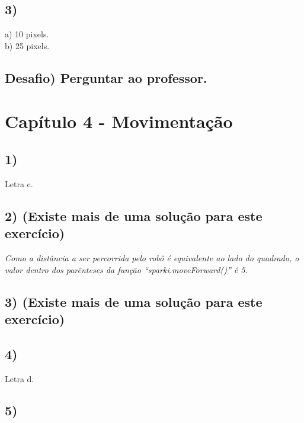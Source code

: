     \subsection*{3)} 
    
     a) 10 pixels.\\
    \indent b) 25 pixels.

    \subsection*{Desafio) Perguntar ao professor.}

\section*{Capítulo 4 - Movimentação}

    \subsection*{1)}
    Letra c.
    
    \subsection*{2) (Existe mais de uma solução para este exercício)}

 

    \textsl{Como a distância a ser percorrida pelo robô é equivalente ao lado do quadrado, o valor dentro dos parênteses da função ``sparki.moveForward()'' é 5.}
    
    \subsection*{3) (Existe mais de uma solução para este exercício)} 
    
     
    
    \subsection*{4)}
    Letra d.
    
    \subsection*{5)}
    
